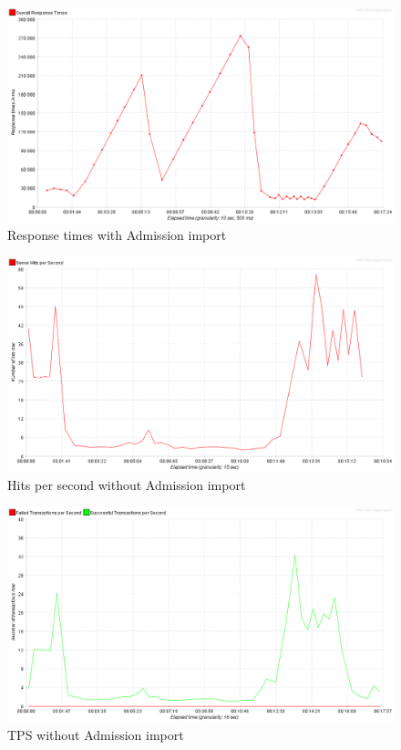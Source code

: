 	\begin{figure}[h]
		\label{fig:jmeter:response_times_over_time_250_with_admission_import}
		\centering
		\includegraphics[width=12cm]{figures/jmeter/response_times_over_time_250_with_admission_import}
		\caption{Response times with Admission import}
	\end{figure}

	\begin{figure}[h]
		\label{fig:jmeter:hits_per_second_250_without_admission_import}
		\centering
		\includegraphics[width=12cm]{figures/jmeter/hits_per_second_250_without_admission_import}
		\caption{Hits per second without Admission import}
	\end{figure}

	\begin{figure}[h]
		\label{fig:jmeter:tps_250_without_admission_import}
		\centering
		\includegraphics[width=12cm]{figures/jmeter/tps_250_without_admission_import}
		\caption{TPS without Admission import}
	\end{figure}


